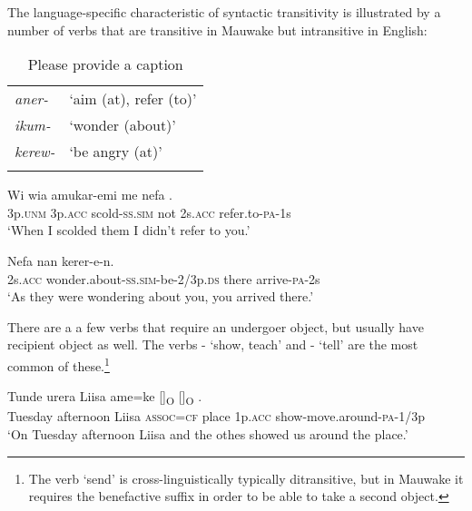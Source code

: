 The language-specific characteristic of syntactic transitivity \citep[49--51]{Kittila2002} is illustrated by a number of verbs that are transitive in Mauwake but intransitive in English:

\begin{table}
\caption{Please provide a caption}
 
\begin{tabular}{>{\itshape}ll}
\mytoprule
aner- &`aim (at), refer (to)'\\
ikum- &`wonder (about)'\\
kerew- &`be angry (at)'\\
\mybottomrule
\end{tabular}

\end{table}

\ea%
\label{ex:3:x302}
\gll Wi wia amukar-emi me nefa . \\
3p.\textsc{unm} 3p.\textsc{acc} scold-\textsc{ss}.\textsc{sim} not 2s.\textsc{acc} refer.to-\textsc{pa}-1s \\
\glt`When I scolded them I didn't refer to you.'
\z

\ea%
\label{ex:3:x303}
\gll Nefa  nan kerer-e-n. \\
2s.\textsc{acc} wonder.about-\textsc{ss}.\textsc{sim}-be-2/3p.\textsc{ds} there arrive-\textsc{pa}-2s\\
\glt`As they were wondering about you, you arrived there.'
\z

There are a a few verbs that require an undergoer object, but usually have recipient object as well. The verbs - `show, teach' and - `tell' are the most common of these.\footnote{The verb `send' is cross-linguistically typically ditransitive, but in Mauwake it requires the benefactive suffix in order to be able to take a second object.} 

\ea%
\label{ex:3:x1838}
\gll Tunde urera Liisa ame=ke []\textsubscript{O} []\textsubscript{O} \textstyleEmphasizedVernacularWords{-}\textstyleEmphasizedVernacularWords{-}.\\
Tuesday afternoon Liisa \textsc{assoc}=\textsc{cf} place 1p.\textsc{acc} show-move.around-\textsc{pa}-1/3p\\
\glt`On Tuesday afternoon Liisa and the othes showed us around the place.'
\z

